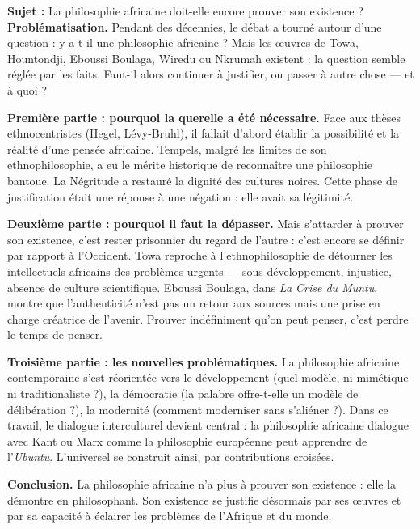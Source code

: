 \documentclass[11pt]{article}
\begin{document}
\begin{exoresolu}
\textbf{Sujet :} La philosophie africaine doit-elle encore prouver son existence ?
\tcblower
\textbf{Problématisation.} Pendant des décennies, le débat a tourné autour d'une question : y a-t-il une philosophie africaine ? Mais les œuvres de Towa, Hountondji, Eboussi Boulaga, Wiredu ou Nkrumah existent : la question semble réglée par les faits. Faut-il alors continuer à justifier, ou passer à autre chose — et à quoi ?

\textbf{Première partie : pourquoi la querelle a été nécessaire.} Face aux thèses ethnocentristes (Hegel, Lévy-Bruhl), il fallait d'abord établir la possibilité et la réalité d'une pensée africaine. Tempels, malgré les limites de son ethnophilosophie, a eu le mérite historique de reconnaître une philosophie bantoue. La Négritude a restauré la dignité des cultures noires. Cette phase de justification était une réponse à une négation : elle avait sa légitimité.

\textbf{Deuxième partie : pourquoi il faut la dépasser.} Mais s'attarder à prouver son existence, c'est rester prisonnier du regard de l'autre : c'est encore se définir par rapport à l'Occident. Towa reproche à l'ethnophilosophie de détourner les intellectuels africains des problèmes urgents — sous-développement, injustice, absence de culture scientifique. Eboussi Boulaga, dans \emph{La Crise du Muntu}, montre que l'authenticité n'est pas un retour aux sources mais une prise en charge créatrice de l'avenir. Prouver indéfiniment qu'on peut penser, c'est perdre le temps de penser.

\textbf{Troisième partie : les nouvelles problématiques.} La philosophie africaine contemporaine s'est réorientée vers le développement (quel modèle, ni mimétique ni traditionaliste ?), la démocratie (la palabre offre-t-elle un modèle de délibération ?), la modernité (comment moderniser sans s'aliéner ?). Dans ce travail, le dialogue interculturel devient central : la philosophie africaine dialogue avec Kant ou Marx comme la philosophie européenne peut apprendre de l'\emph{Ubuntu}. L'universel se construit ainsi, par contributions croisées.

\textbf{Conclusion.} La philosophie africaine n'a plus à prouver son existence : elle la démontre en philosophant. Son existence se justifie désormais par ses œuvres et par sa capacité à éclairer les problèmes de l'Afrique et du monde.
\end{exoresolu}
\end{document}
